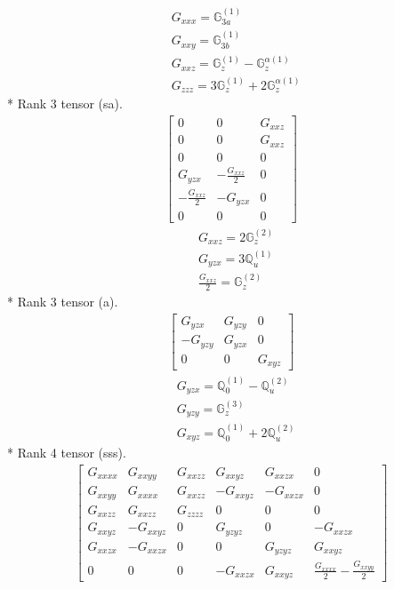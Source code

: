 \documentclass[fleqn,8pt,landscape]{jsarticle}
\begin{document}
\begin{align*}
& G_{xxx} = \mathbb{G}_{3a}^{(1)} \\
& G_{xxy} = \mathbb{G}_{3b}^{(1)} \\
& G_{xxz} = \mathbb{G}_{z}^{(1)} - \mathbb{G}_{z}^{\alpha(1)} \\
& G_{zzz} = 3 \mathbb{G}_{z}^{(1)} + 2 \mathbb{G}_{z}^{\alpha(1)}
\end{align*}
* Rank 3 tensor (sa).
\begin{align*}
\begin{bmatrix} 0 & 0 & G_{xxz} \\ 0 & 0 & G_{xxz} \\ 0 & 0 & 0 \\ G_{yzx} & - \frac{G_{xxz}}{2} & 0 \\ - \frac{G_{xxz}}{2} & - G_{yzx} & 0 \\ 0 & 0 & 0 \end{bmatrix}
\end{align*}
\begin{align*}
& G_{xxz} = 2 \mathbb{G}_{z}^{(2)} \\
& G_{yzx} = 3 \mathbb{Q}_{u}^{(1)} \\
& \frac{G_{xxz}}{2} = \mathbb{G}_{z}^{(2)}
\end{align*}
* Rank 3 tensor (a).
\begin{align*}
\begin{bmatrix} G_{yzx} & G_{yzy} & 0 \\ - G_{yzy} & G_{yzx} & 0 \\ 0 & 0 & G_{xyz} \end{bmatrix}
\end{align*}
\begin{align*}
& G_{yzx} = \mathbb{Q}_{0}^{(1)} - \mathbb{Q}_{u}^{(2)} \\
& G_{yzy} = \mathbb{G}_{z}^{(3)} \\
& G_{xyz} = \mathbb{Q}_{0}^{(1)} + 2 \mathbb{Q}_{u}^{(2)}
\end{align*}
* Rank 4 tensor (sss).
\begin{align*}
\begin{bmatrix} G_{xxxx} & G_{xxyy} & G_{xxzz} & G_{xxyz} & G_{xxzx} & 0 \\ G_{xxyy} & G_{xxxx} & G_{xxzz} & - G_{xxyz} & - G_{xxzx} & 0 \\ G_{xxzz} & G_{xxzz} & G_{zzzz} & 0 & 0 & 0 \\ G_{xxyz} & - G_{xxyz} & 0 & G_{yzyz} & 0 & - G_{xxzx} \\ G_{xxzx} & - G_{xxzx} & 0 & 0 & G_{yzyz} & G_{xxyz} \\ 0 & 0 & 0 & - G_{xxzx} & G_{xxyz} & \frac{G_{xxxx}}{2} - \frac{G_{xxyy}}{2} \end{bmatrix}
\end{align*}
\end{document}

